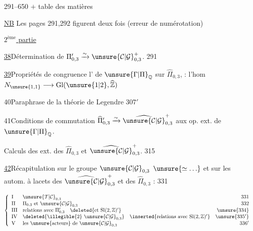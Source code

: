 
 291--650 $+$ table des matières

\uline{NB} Les pages 291,292 figurent deux fois
(erreur de numérotation)


\uline{$2^{\text{ème}}$ partie}\quad
{}

\uline{38}\quad Détermination de
$\Pi'_{0,3}\xrightarrow{\sim}\unsure{\mathcal C|\mathcal G}_{0,3}^{+}$.
\hfill 291

\uline{39}\quad Propriétés de congruence  l'
de $\unsure{\Gamma|\Pi}_{\mathbb Q}$ sur $\widehat{\Pi}_{0,3}$,
 : l'hom
$N_{\unsure{1,1}}\longrightarrow \mathrm{Gl}(\unsure{1|2},\widehat{\mathbb Z})$
\hfill {}

40\quad Paraphrase  de la
théorie de Legendre
\hfill $307'$

41\quad Conditions de commutation 
$\widehat{\Pi}'_{0,3}\xrightarrow{\sim}\widehat{\unsure{\mathcal C|\mathcal G}}_{0,3}^{+}$
aux op. ext. de $\unsure{\Gamma|\Pi}_{\mathbb Q}$.
\hfill {}

Calculs des  ext. des $\widehat{\Pi}_{0,3}$ et
 $\widehat{\unsure{\mathcal C|\mathcal G}}_{0,3}^{+}$.
\hfill 315

\uline{42}\quad Récapitulation sur le groupe
$\unsure{\mathcal C|\mathcal G}_{0,3}$
$\unsure{\simeq\ldots}$ et sur les autom. à lacets des
$\widehat{\unsure{\mathcal C|\mathcal G}}_{0,3}^{+}$ et des
$\widehat{\Pi}_{0,3}$ :
\hfill 331

\[
\left\{
\begin{array}{llr}
\mathrm{I}&\unsure{\mathcal T|\mathcal C}_{0,3}&331\\
\mathrm{II}&\Pi_{0,3}\text{ et }\unsure{\mathcal C|\mathcal G}_{0,3}&332\\
\mathrm{III}&\text{relations avec }\Pi'_{0,3}\quad
\deleted{\text{et }\mathrm{Sl}(2,\mathbb Z)'}&\unsure{334}\\
\mathrm{IV}&\deleted{\text{\illegible{2}}\ \unsure{\mathcal C|\mathcal G}_{0,3}}\quad
\inserted{\text{relations avec }\mathrm{Sl}(2,\mathbb Z)'}&\unsure{335'}\\
\mathrm{V}&\text{les \unsure{acteurs} de }\unsure{\mathcal C|\mathcal G}_{0,3}&336'
\end{array}
\right.
\]

